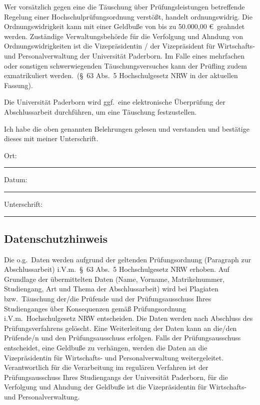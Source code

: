 \begin{small}
  Wer vorsätzlich gegen eine die Täuschung über Prüfungsleistungen betreffende Regelung einer Hochschulprü\-fungsordnung verstößt, handelt ordnungswidrig.
  Die Ordnungswidrigkeit kann mit einer Geldbuße von bis zu 50.000,00 \euro~geahndet werden.
  Zuständige Verwaltungsbehörde für die Verfolgung und Ahndung von Ordnungswidrigkeiten ist die Vizepräsidentin / der Vizepräsident für Wirtschafts- und Personalverwaltung der Universität Paderborn.
  Im Falle eines mehrfachen oder sonstigen schwerwiegenden Täuschungsversuches kann der Prüfling zudem exmatrikuliert werden.~(§~63 Abs.~5 Hochschulgesetz NRW in der aktuellen Fassung).

  \medskip

  Die Universität Paderborn wird ggf.~eine elektronische Überprüfung der Abschlussarbeit durchführen, um eine Täuschung festzustellen.

  \medskip

  Ich habe die oben genannten Belehrungen gelesen und verstanden und bestätige dieses mit meiner Unterschrift.

  \vspace{2\bigskipamount}

  Ort: \parbox[t]{.4\linewidth}{\rule[-3pt]{\linewidth}{.4pt}} \hspace{2ex} Datum: \parbox[t]{.15\linewidth}{\rule[-3pt]{\linewidth}{.4pt}}

  \vspace{2\bigskipamount}

  Unterschrift: \parbox[t]{.5\linewidth}{\rule[-3pt]{\linewidth}{.4pt}}

  \subsection*{Datenschutzhinweis}

  Die o.g.~Daten werden aufgrund der geltenden Prüfungsordnung (Paragraph zur Abschlussarbeit) i.V.m.~§~63 Abs.~5 Hochschulgesetz NRW erhoben.
  Auf Grundlage der übermittelten Daten (Name, Vorname, Matrikelnummer, Studiengang, Art und Thema der Abschlussarbeit) wird bei Plagiaten bzw.~Täuschung der/die Prüfende und der Prüfungsausschuss Ihres Studienganges über Konsequenzen gemäß Prüfungsordnung i.V.m.~Hochschulgesetz NRW entscheiden.
  Die Daten werden nach Abschluss des Prüfungsverfahrens gelöscht.
  Eine Weiterleitung der Daten kann an die/den Prüfende/n und den Prüfungsausschuss erfolgen.
  Falls der Prüfungsausschuss entscheidet, eine Geldbuße zu verhängen, werden die Daten an die Vizepräsidentin für Wirtschafts- und Personalverwaltung weitergeleitet.
  Verantwortlich für die Verarbeitung im regulären Verfahren ist der Prüfungsausschuss Ihres Studiengangs der Universität Paderborn, für die Verfolgung und Ahndung der Geldbuße ist die Vizepräsidentin für Wirtschafts- und Personalverwaltung.

\end{small}

\restoregeometry
